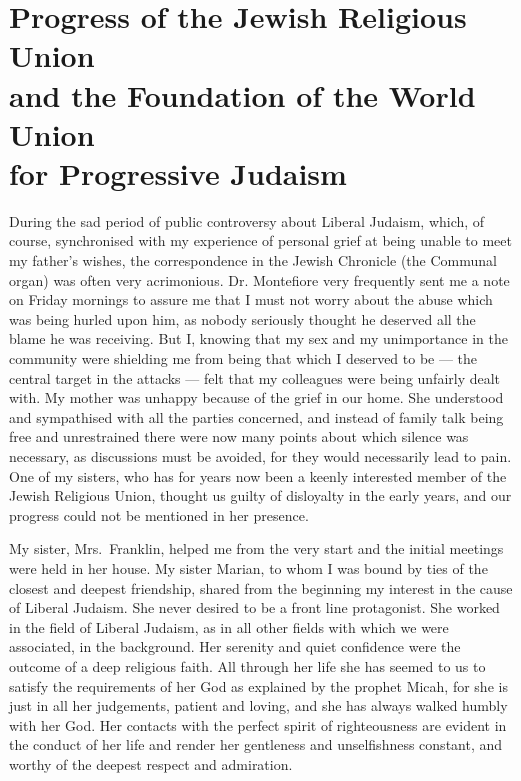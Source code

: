 \chapter[Progress of the Jewish Religious Union
and the Foundation of the World Union
for Progressive Judaism]{Progress of the Jewish Religious Union\\
and the Foundation of the World Union\\
for Progressive Judaism}

During the sad period of public controversy about
Liberal Judaism, which, of course, synchronised with my
experience of personal grief at being unable to meet my
father’s wishes, the correspondence in the Jewish Chronicle
(the Communal organ) was often very acrimonious.
Dr. Montefiore very frequently sent me a note on Friday
mornings to assure me that I must not worry about the
abuse which was being hurled upon him, as nobody
seriously thought he deserved all the blame he was
receiving. But I, knowing that my sex and my
unimportance in the community were shielding me from
being that which I deserved to be — the central target in
the attacks — felt that my colleagues were being unfairly
dealt with. My mother was unhappy because of the
grief in our home. She understood and sympathised with
all the parties concerned, and instead of family talk
being free and unrestrained there were now many points
about which silence was necessary, as discussions must be
avoided, for they would necessarily lead to pain. One
of my sisters, who has for years now been a keenly interested
member of the Jewish Religious Union, thought us
guilty of disloyalty in the early years, and our progress
could not be mentioned in her presence.

My sister, Mrs.\ Franklin, helped me from the very
start and the initial meetings were held in her house.
My sister Marian, to whom I was bound by ties of the
closest and deepest friendship, shared from the beginning
my interest in the cause of Liberal Judaism. She never
desired to be a front line protagonist. She worked in the
field of Liberal Judaism, as in all other fields with which
we were associated, in the background. Her serenity
and quiet confidence were the outcome of a deep religious
faith. All through her life she has seemed to us to
satisfy the requirements of her God as explained by the
prophet Micah, for she is just in all her judgements,
patient and loving, and she has always walked humbly
with her God. Her contacts with the perfect spirit of
righteousness are evident in the conduct of her life and
render her gentleness and unselfishness constant, and
worthy of the deepest respect and admiration.

